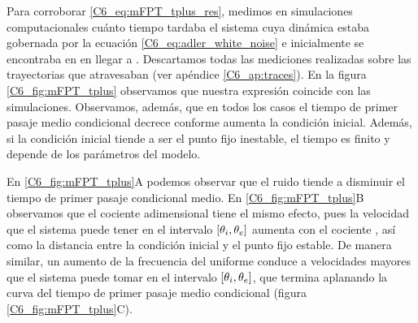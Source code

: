 \documentclass[./main.tex]{subfiles}
\begin{document}
Para corroborar \ref{C6_eq:mFPT_tplus_res}, medimos en simulaciones computacionales cuánto tiempo tardaba el sistema cuya dinámica estaba gobernada por la ecuación \ref{C6_eq:adler_white_noise} e inicialmente se encontraba en \xx en llegar a \xxe. Descartamos todas las mediciones realizadas sobre las trayectorias que atravesaban \xxi (ver apéndice \ref{C6_ap:traces}). En la figura \ref{C6_fig:mFPT_tplus} observamos que nuestra expresión coincide con las simulaciones. Observamos, además, que en todos los casos el tiempo de primer pasaje medio condicional decrece conforme aumenta la condición inicial. Además, si la condición inicial tiende a ser el punto fijo inestable, el tiempo es finito y depende de los parámetros del modelo. 


En \ref{C6_fig:mFPT_tplus}A podemos observar que el ruido tiende a disminuir el tiempo de primer pasaje condicional medio. En \ref{C6_fig:mFPT_tplus}B observamos que el cociente adimensional \ddelta tiene el mismo efecto, pues la velocidad que el sistema puede tener en el intervalo $[\theta_i,\theta_e]$ aumenta con el cociente \ddelta, así como la distancia entre la condición inicial \xx y el punto fijo estable. De manera similar, un aumento de la frecuencia del uniforme conduce a velocidades mayores que el sistema puede tomar en el intervalo $[\theta_i,\theta_e]$, que termina aplanando la curva del tiempo de primer pasaje medio condicional (figura \ref{C6_fig:mFPT_tplus}C). 
\end{document}

